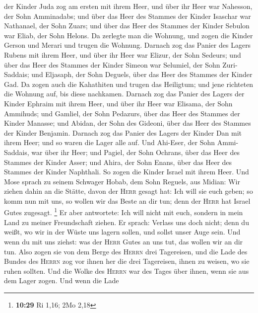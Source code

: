 der Kinder Juda zog am ersten mit ihrem Heer, und über ihr Heer war
Nahesson, der Sohn Amminadabs;  und über das Heer des
Stammes der Kinder Isaschar war Nathanael, der Sohn Zuars;
 und über das Heer des Stammes der Kinder Sebulon war
Eliab, der Sohn Helons.  Da zerlegte man die Wohnung, und
zogen die Kinder Gerson und Merari und trugen die Wohnung.
 Darnach zog das Panier des Lagers Rubens mit ihrem Heer,
und über ihr Heer war Elizur, der Sohn Sedeurs;  und über
das Heer des Stammes der Kinder Simeon war Selumiel, der Sohn
Zuri-Saddais;  und Eljasaph, der Sohn Deguels, über das
Heer des Stammes der Kinder Gad.  Da zogen auch die
Kahathiten und trugen das Heiligtum; und jene richteten die Wohnung auf,
bis diese nachkamen.  Darnach zog das Panier des Lagers
der Kinder Ephraim mit ihrem Heer, und über ihr Heer war Elisama, der
Sohn Ammihuds;  und Gamliel, der Sohn Pedazurs, über das
Heer des Stammes der Kinder Manasse;  und Abidan, der
Sohn des Gideoni, über das Heer des Stammes der Kinder Benjamin.
 Darnach zog das Panier des Lagers der Kinder Dan mit
ihrem Heer; und so waren die Lager alle auf. Und Ahi-Eser, der Sohn
Ammi-Saddais, war über ihr Heer;  und Pagiel, der Sohn
Ochrans, über das Heer des Stammes der Kinder Asser;  und
Ahira, der Sohn Enans, über das Heer des Stammes der Kinder Naphthali.
 So zogen die Kinder Israel mit ihrem Heer.
 Und Mose sprach zu seinem Schwager Hobab, dem Sohn
Reguels, aus Midian: Wir ziehen dahin an die Stätte, davon der
\textsc{Herr} gesagt hat: Ich will sie euch geben; so komm nun mit uns,
so wollen wir das Beste an dir tun; denn der \textsc{Herr} hat Israel
Gutes zugesagt. \footnote{\textbf{10:29} Ri 1,16; 2Mo 2,18}
 Er aber antwortete: Ich will nicht mit euch, sondern in
mein Land zu meiner Freundschaft ziehen.  Er sprach:
Verlass uns doch nicht; denn du weißt, wo wir in der Wüste uns lagern
sollen, und sollst unser Auge sein.  Und wenn du mit uns
ziehst: was der \textsc{Herr} Gutes an uns tut, das wollen wir an dir
tun.  Also zogen sie von dem Berge des \textsc{Herrn}
drei Tagereisen, und die Lade des Bundes des \textsc{Herrn} zog vor
ihnen her die drei Tagereisen, ihnen zu weisen, wo sie ruhen sollten.
 Und die Wolke des \textsc{Herrn} war des Tages über
ihnen, wenn sie aus dem Lager zogen.  Und wenn die Lade
